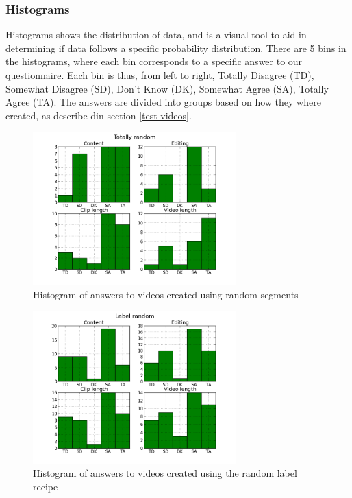 \subsubsection{Histograms}\label{sec:histograms}
%
Histograms shows the distribution of data, and is a visual tool to aid in determining if data follows a specific probability distribution. There are 5 bins in the histograms, where each bin corresponds to a specific answer to our questionnaire. Each bin is thus, from left to right, Totally Disagree (TD), Somewhat Disagree (SD), Don't Know (DK), Somewhat Agree (SA), Totally Agree (TA). The answers are divided into groups based on how they where created, as describe din section \ref{test videos}.
%
\begin{figure}[!ht]
     \centering
     \includegraphics[width=0.7\textwidth]{img/totallyrandom_barplot.png}
     \caption{Histogram of answers to videos created using random segments}\label{fig:hist_random}
\end{figure}
%
\begin{figure}[!ht]
     \centering
     \includegraphics[width=0.7\textwidth]{img/labelrandom_barplot.png}
     \caption{Histogram of answers to videos created using the random label recipe}\label{fig:hist_labelrandom}
\end{figure}
